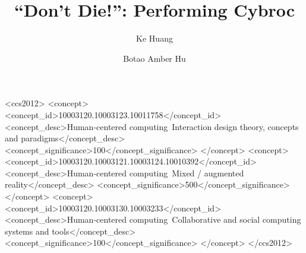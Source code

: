 \documentclass[manuscript,review]{acmart}
\begin{document}

\title{``Don't Die!'': Performing Cybroc}



\author{Ke Huang}

\author{Botao Amber Hu}



\begin{abstract}

\end{abstract}

\begin{CCSXML}
<ccs2012>
<concept>
  <concept_id>10003120.10003123.10011758</concept_id>
  <concept_desc>Human-centered computing~Interaction design theory, concepts and paradigms</concept_desc>
  <concept_significance>100</concept_significance>
</concept>
<concept>
  <concept_id>10003120.10003121.10003124.10010392</concept_id>
  <concept_desc>Human-centered computing~Mixed / augmented reality</concept_desc>
  <concept_significance>500</concept_significance>
</concept>
<concept>
<concept_id>10003120.10003130.10003233</concept_id>
<concept_desc>Human-centered computing~Collaborative and social computing systems and tools</concept_desc>
<concept_significance>100</concept_significance>
</concept>
</ccs2012>
\end{CCSXML}
\end{document}
